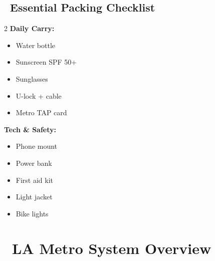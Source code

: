 \documentclass[10pt,letterpaper]{article}
\begin{document}
\subsection*{\faBackspace\ Essential Packing Checklist}

\begin{small}
\begin{multicols}{2}
\textbf{Daily Carry:}
\begin{itemize}[leftmargin=0.2in]
\item Water bottle
\item Sunscreen SPF 50+
\item Sunglasses
\item U-lock + cable
\item Metro TAP card
\end{itemize}

\columnbreak

\textbf{Tech \& Safety:}
\begin{itemize}[leftmargin=0.2in]
\item Phone mount
\item Power bank
\item First aid kit
\item Light jacket
\item Bike lights
\end{itemize}
\end{multicols}
\end{small}

\newpage


\section*{\faSubway\ LA Metro System Overview}
\end{document}
